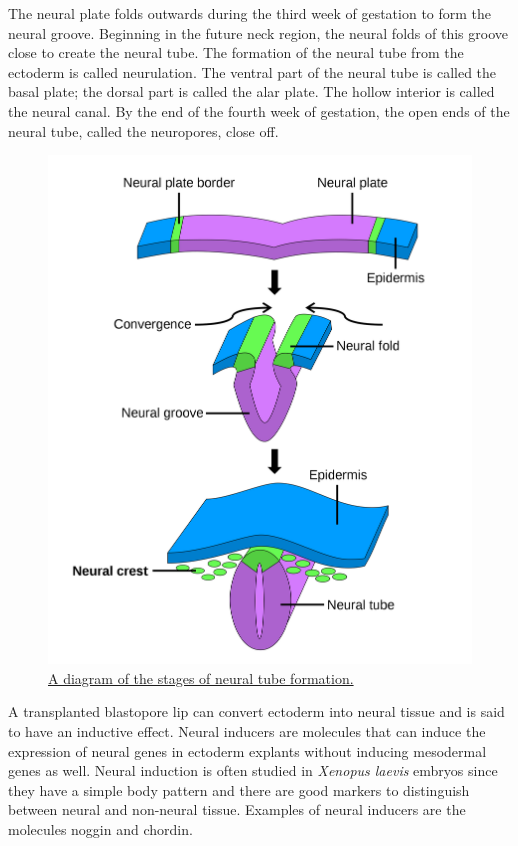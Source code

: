 The neural plate folds outwards during the third week of gestation to form the neural groove. Beginning in the future neck region, the neural folds of this groove close to create the neural tube. The formation of the neural tube from the ectoderm is called neurulation. The ventral part of the neural tube is called the basal plate; the dorsal part is called the alar plate. The hollow interior is called the neural canal. By the end of the fourth week of gestation, the open ends of the neural tube, called the neuropores, close off.



\begin{figure}

{\centering \includegraphics[width=0.7\linewidth]{./figures/development/neurulation} 

}

\caption{\href{https://en.wikipedia.org/wiki/Neural_tube\#/media/File:Neural_crest.svg}{A diagram of the stages of neural tube formation.}}\label{fig:neurulation}
\end{figure}

A transplanted blastopore lip can convert ectoderm into neural tissue and is said to have an inductive effect. Neural inducers are molecules that can induce the expression of neural genes in ectoderm explants without inducing mesodermal genes as well. Neural induction is often studied in \emph{Xenopus laevis} embryos since they have a simple body pattern and there are good markers to distinguish between neural and non-neural tissue. Examples of neural inducers are the molecules noggin and chordin.


